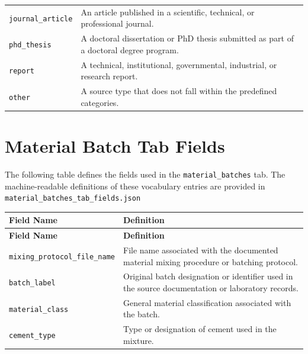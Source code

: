 \documentclass[11pt]{book}
\begin{document}
{\begin{longtable}{p{}p{}}
\texttt{journal\_article} &
An article published in a scientific, technical, or professional journal. \\

\texttt{phd\_thesis} &
A doctoral dissertation or PhD thesis submitted as part of a doctoral degree program. \\

\texttt{report} &
A technical, institutional, governmental, industrial, or research report. \\

\texttt{other} &
A source type that does not fall within the predefined categories. \\

\hline
\end{longtable}


\section{Material Batch Tab Fields}
\label{vocab:material_batch_tab_fields}

The following table defines the fields used in the \texttt{material\_batches} tab. The machine-readable definitions of these vocabulary entries are provided in \texttt{material\_batches\_tab\_fields.json}

\begin{longtable}{p{}p{}}
\hline
\textbf{Field Name} & \textbf{Definition} \\
\hline
\endfirsthead

\hline
\textbf{Field Name} & \textbf{Definition} \\
\hline
\endhead

\texttt{mixing\_protocol\_file\_name} &
File name associated with the documented material mixing procedure or batching protocol. \\

\texttt{batch\_label} &
Original batch designation or identifier used in the source documentation or laboratory records. \\

\texttt{material\_class} &
General material classification associated with the batch. \\

\texttt{cement\_type} &
Type or designation of cement used in the mixture. \\


\end{longtable}}
\end{document}
